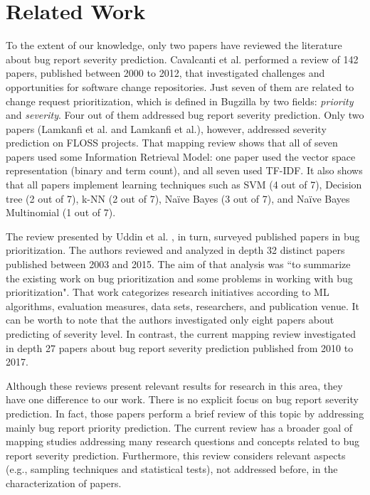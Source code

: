 \section{Related Work}\label{sec:relatedwork} 

To the extent of our knowledge, only two papers\cite{Cavalcanti:2014, Uddin:2017} have reviewed the literature about bug report severity prediction. Cavalcanti et al.\cite{Cavalcanti:2014} performed a review of 142 papers, published between 2000 to 2012, that investigated challenges and opportunities for software change repositories. Just seven of them are related to change request prioritization, which is defined in Bugzilla by two fields: \textit{priority} and \textit{severity}. Four out of them addressed bug report severity prediction. Only two papers (Lamkanfi et al.\cite{Lamkanfi:2010} and Lamkanfi et al.\cite{Lamkanfi:2011}), however, addressed severity prediction on FLOSS projects. That mapping review shows that all of seven papers used some Information Retrieval Model: one paper used the vector space representation (binary and term count), and all seven used TF-IDF. It also shows that all papers implement learning techniques such as SVM (4 out of 7), Decision tree (2 out of 7), k-NN (2 out of 7), Naïve Bayes (3 out of 7), and Naïve Bayes Multinomial (1 out of 7).

The review presented by Uddin et al. \cite{Uddin:2017}, in turn, surveyed published papers in bug prioritization. The authors reviewed and analyzed in depth 32 distinct papers published between 2003 and 2015. The aim of that analysis was ``to summarize the existing work on bug prioritization and some problems in working with bug prioritization". That work categorizes research initiatives according to ML algorithms, evaluation measures, data sets, researchers, and publication venue. It can be worth to note that the authors investigated only eight papers about predicting of severity level. In contrast, the current mapping review investigated in depth 27 papers about bug report severity prediction published from 2010 to 2017.

Although these reviews present relevant results for research in this area, they have one difference to our work. There is no explicit focus on bug report severity prediction. In fact, those papers perform a brief review of this topic by addressing mainly bug report priority prediction. The current review has a broader goal of mapping studies addressing many research questions and concepts related to bug report severity prediction. Furthermore, this review considers relevant aspects (e.g., sampling techniques and statistical tests), not addressed before, in the characterization of papers.